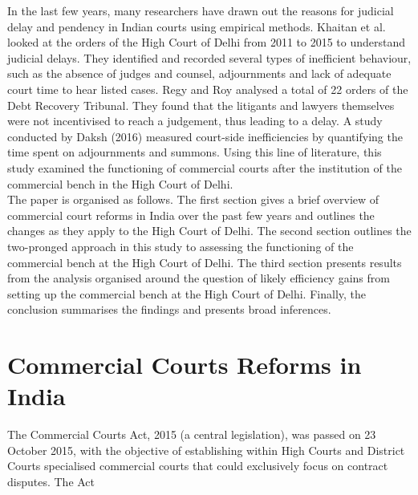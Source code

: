 \documentclass[a4paper, 12pt, twoside]{article}
\begin{document}
In the last few years, many researchers have drawn out the reasons for judicial delay and pendency in Indian courts using empirical methods. Khaitan et al. \parencite{Vidhipaper} looked at the orders of the High Court of Delhi from 2011 to 2015 to understand judicial delays. They identified and recorded several types of inefficient behaviour, such as the absence of judges and counsel, adjournments and lack of adequate court time to hear listed cases. Regy and Roy \parencite{shubhopaper} analysed a total of 22 orders of the Debt Recovery Tribunal. They found that the litigants and lawyers themselves were not incentivised to reach a judgement, thus leading to a delay. A study conducted by Daksh (2016) measured court-side inefficiencies by quantifying the time spent on adjournments and summons. Using this line of literature, this study examined the functioning of commercial courts after the institution of the commercial bench in the High Court of Delhi. \\

The paper is organised as follows. The first section gives a brief overview of commercial court reforms in India over the past few years and outlines the changes as they apply to the High Court of Delhi. The second section outlines the two-pronged approach in this study to assessing the functioning of the commercial bench at the High Court of Delhi. The third section presents results from the analysis organised around the question of likely efficiency gains from setting up the commercial bench at the High Court of Delhi. Finally, the conclusion summarises the findings and presents broad inferences.  

\section{Commercial Courts Reforms in India}\label{sec:1}

The Commercial Courts Act, 2015 (a central legislation), was passed on 23 October 2015, with the objective of establishing within High Courts and District Courts specialised commercial courts that could exclusively focus on contract disputes. The Act
\end{document}
